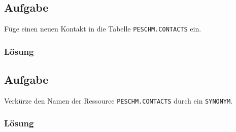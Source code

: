 \subsection{Aufgabe}
\label{sec:uebung_03.aufgabe_03}
Füge einen neuen Kontakt in die Tabelle \texttt{PESCHM.CONTACTS} ein.

\subsubsection*{Lösung}
\label{sec:uebung_03.aufgabe_03.loesung}

\subsection{Aufgabe}
\label{sec:uebung_03.aufgabe_04}
Verkürze den Namen der Ressource \texttt{PESCHM.CONTACTS} durch ein \texttt{SYNONYM}.

\subsubsection*{Lösung}
\label{sec:uebung_03.aufgabe_04.loesung}

